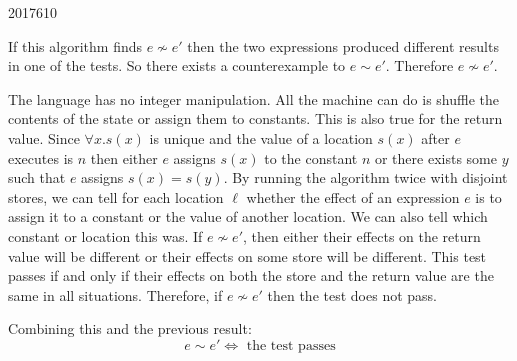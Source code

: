 \documentclass[10pt,\jkfside,a4paper]{article}
\begin{document}
\begin{examquestion}{2017}{6}{10}
\begin{enumerate}[label=(\alph*)]
If this algorithm finds $e \nsim e'$ then the two expressions produced
different results in one of the tests. So there exists a counterexample to
$e \sim e'$. Therefore $e \nsim e'$.

The language has no integer manipulation. All the machine can do
is shuffle the contents of the state or assign them to constants. This is
also true for the return value. Since $\forall x. s(x)$ is unique and the
value of a location $s(x)$ after $e$ executes is $n$ then
either $e$ assigns $s(x)$ to the constant $n$ or there exists some $y$ such
that $e$ assigns $s(x) = s(y)$. By running the algorithm twice with
disjoint stores, we can tell for each location $\ell$ whether
the effect of an expression $e$ is to assign it to a constant or the value
of another location. We can also tell which constant or location this was. If
$e \nsim e'$, then either their effects on the return value will be
different or their effects on some store will be different. This test passes
if and only if their effects on both the store and the return value are the
same in all situations. Therefore, if $e \nsim e'$ then the test does not pass.

Combining this and the previous result:
\[
e \sim e' \Longleftrightarrow \text{ the test passes}
\]

\end{enumerate}

\end{examquestion}
\end{document}
